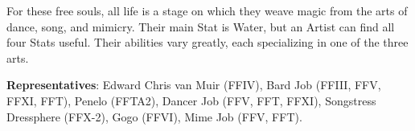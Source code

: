 \begin{jobdesc}[name=pjob-artist]
    For these free souls, all life is a stage on which they weave magic from the arts of dance, song, and mimicry. Their main Stat is Water, but an Artist can find all four Stats useful. Their abilities vary greatly, each specializing in one of the three arts.\pc%

    \textbf{Representatives}:
    Edward Chris van Muir (FFIV),
    Bard Job (FFIII, FFV, FFXI, FFT),
    Penelo (FFTA2),
    Dancer Job (FFV, FFT, FFXI),
    Songstress Dressphere (FFX-2),
    Gogo (FFVI),
    Mime Job (FFV, FFT).
    \pc%

    \jobstats[hpa=4x, hpb=5x, hpc=6x, hpd=7x, mpa=0x, mpb=1x, mpc=2x, armor=Medium,
      weapons=Claws / Gloves \\ Light Swords / Knives \\ Instruments \\ Throwing Weapons]

\end{jobdesc}

